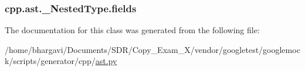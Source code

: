 \subsubsection[{\texorpdfstring{fields}{fields}}]{\setlength{\rightskip}{0pt plus 5cm}cpp.\+ast.\+\_\+\+Nested\+Type.\+fields}\hypertarget{classcpp_1_1ast_1_1___nested_type_aed69c37a409b4d26e6cfde2de3185d86}{}\label{classcpp_1_1ast_1_1___nested_type_aed69c37a409b4d26e6cfde2de3185d86}


The documentation for this class was generated from the following file\+:\begin{DoxyCompactItemize}
\item 
/home/bhargavi/\+Documents/\+S\+D\+R/\+Copy\+\_\+\+Exam\+\_\+X/vendor/googletest/googlemock/scripts/generator/cpp/\hyperlink{ast_8py}{ast.\+py}\end{DoxyCompactItemize}
